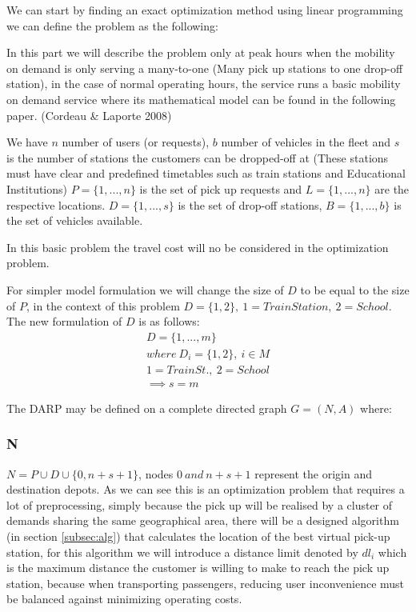 \documentclass{article}
\begin{document}
We can start by finding an exact optimization method using linear programming we can define the problem as the following:

In this part we will describe the problem only at peak hours when the mobility on demand is only serving a many-to-one (Many pick up stations to one drop-off station), in the case of normal operating hours, the service runs a basic 
mobility on demand service where its mathematical model can be found in the following paper. (Cordeau \& Laporte 2008) \citep{2008_Cordeau_Laporte}

We have $n$ number of users (or requests), $b$ number of vehicles in the fleet and $s$ is the number of stations the customers can be dropped-off at (These stations must have clear and predefined timetables such as train stations and Educational Institutions)
 $P = \{ 1, ..., n \}$ is the set of pick up requests and  $L = \{ 1, ..., n \}$ are the respective locations.
$D =  \{ 1, ..., s \}$ is the set of drop-off stations, $B =  \{ 1, ..., b \}$ is the set of vehicles available.

In this basic problem the travel cost will no be considered in the optimization problem. %

For simpler model formulation we will change the size of $D$ to be equal to the size of $P$, in the context of this problem $D = \{1,2\},\ 1 = Train Station,\ 2 = School$. The new formulation of $D$ is as follows:
\begin{equation*}
\begin{array}{l}
D = \{1, ..., m\}\\
where\ D_i = \{1,2\}, \ i \in M \\
1 = Train St.,\ 2 = School \\
 \implies s = m 
\end{array}
\end{equation*}


The DARP may be defined on a complete directed graph $G = (N,A)$ where:


\subsubsection*{N}

$N = P \cup D \cup \{0, n + s + 1\}$, nodes $0 \ and \  n + s + 1$ represent the origin and destination depots.
\label{sec:walk_limit}
As we can see this is an optimization problem that requires a lot of preprocessing, simply because the pick up will be realised by a cluster of demands sharing the same geographical area, there will be a designed algorithm (in section \ref{subsec:alg})
that calculates the location of the best virtual pick-up station, for this algorithm we will introduce a distance limit denoted by $dl_i$ which is the maximum distance the customer is willing to make to reach the pick up station,  because when transporting passengers, reducing user inconvenience must be balanced against minimizing operating costs.
\end{document}
